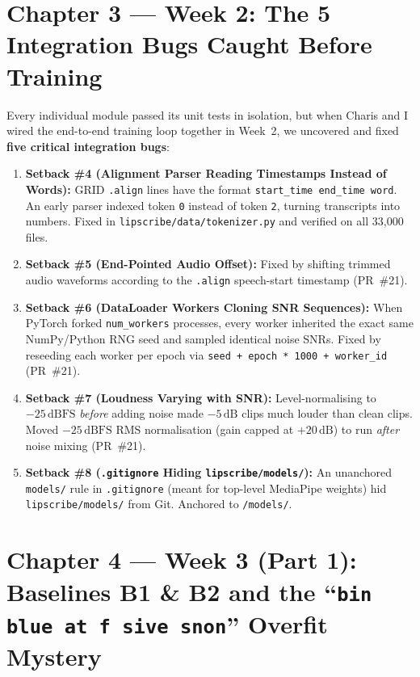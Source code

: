 \documentclass[11pt,a4paper]{article}
\newcommand{\code}[1]{\texttt{\small #1}}
\begin{document}
\section{Chapter 3 --- Week 2: The 5 Integration Bugs Caught Before Training}

Every individual module passed its unit tests in isolation, but when Charis and I wired the end-to-end training loop together in Week~2, we uncovered and fixed \textbf{five critical integration bugs}:
\begin{enumerate}
  \item \textbf{Setback \#4 (Alignment Parser Reading Timestamps Instead of Words):} GRID \code{.align} lines have the format \code{start\_time end\_time word}. An early parser indexed token \code{0} instead of token \code{2}, turning transcripts into numbers. Fixed in \code{lipscribe/data/tokenizer.py} and verified on all 33,000 files.
  \item \textbf{Setback \#5 (End-Pointed Audio Offset):} Fixed by shifting trimmed audio waveforms according to the \code{.align} speech-start timestamp (PR~\#21).
  \item \textbf{Setback \#6 (DataLoader Workers Cloning SNR Sequences):} When PyTorch forked \code{num\_workers} processes, every worker inherited the exact same NumPy/Python RNG seed and sampled identical noise SNRs. Fixed by reseeding each worker per epoch via \code{seed + epoch * 1000 + worker\_id} (PR~\#21).
  \item \textbf{Setback \#7 (Loudness Varying with SNR):} Level-normalising to $-25\,\text{dBFS}$ \emph{before} adding noise made $-5\,\text{dB}$ clips much louder than clean clips. Moved $-25\,\text{dBFS}$ RMS normalisation (gain capped at $+20\,\text{dB}$) to run \emph{after} noise mixing (PR~\#21).
  \item \textbf{Setback \#8 (\code{.gitignore} Hiding \code{lipscribe/models/}):} An unanchored \code{models/} rule in \code{.gitignore} (meant for top-level MediaPipe weights) hid \code{lipscribe/models/} from Git. Anchored to \code{/models/}.
\end{enumerate}

\section{Chapter 4 --- Week 3 (Part 1): Baselines B1 \& B2 and the ``\code{bin blue at f sive snon}'' Overfit Mystery}
\end{document}
